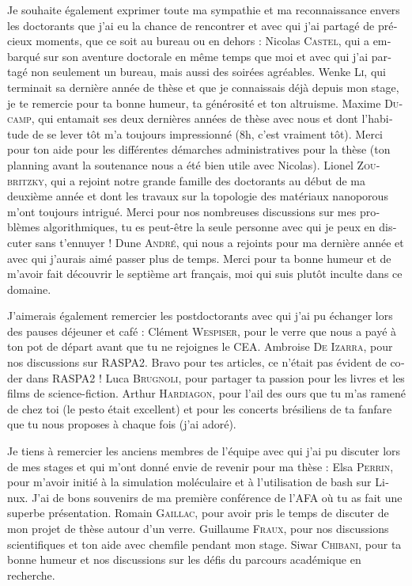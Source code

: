 \begin{otherlanguage}{french}
Je souhaite également exprimer toute ma sympathie et ma reconnaissance envers les doctorants que j'ai eu la chance de rencontrer et avec qui j'ai partagé de précieux moments, que ce soit au bureau ou en dehors :
Nicolas \textsc{Castel}, qui a embarqué sur son aventure doctorale en même temps que moi et avec qui j'ai partagé non seulement un bureau, mais aussi des soirées agréables.
Wenke \textsc{Li}, qui terminait sa dernière année de thèse et que je connaissais déjà depuis mon stage, je te remercie pour ta bonne humeur, ta générosité et ton altruisme.
Maxime \textsc{Ducamp}, qui entamait ses deux dernières années de thèse avec nous et dont l'habitude de se lever tôt m'a toujours impressionné (8h, c'est vraiment tôt). Merci pour ton aide pour les différentes démarches administratives pour la thèse (ton planning avant la soutenance nous a été bien utile avec Nicolas).
Lionel \textsc{Zoubritzky}, qui a rejoint notre grande famille des doctorants au début de ma deuxième année et dont les travaux sur la topologie des matériaux nanoporous m'ont toujours intrigué. Merci pour nos nombreuses discussions sur mes problèmes algorithmiques, tu es peut-être la seule personne avec qui je peux en discuter sans t'ennuyer !
Dune \textsc{André}, qui nous a rejoints pour ma dernière année et avec qui j'aurais aimé passer plus de temps. Merci pour ta bonne humeur et de m'avoir fait découvrir le septième art français, moi qui suis plutôt inculte dans ce domaine.

J'aimerais également remercier les postdoctorants avec qui j'ai pu échanger lors des pauses déjeuner et café :
Clément \textsc{Wespiser}, pour le verre que nous a payé à ton pot de départ avant que tu ne rejoignes le CEA.
Ambroise \textsc{De Izarra}, pour nos discussions sur RASPA2. Bravo pour tes articles, ce n'était pas évident de coder dans RASPA2 !
Luca \textsc{Brugnoli}, pour partager ta passion pour les livres et les films de science-fiction. 
Arthur \textsc{Hardiagon}, pour l'ail des ours que tu m'as ramené de chez toi (le pesto était excellent) et pour les concerts brésiliens de ta fanfare que tu nous proposes à chaque fois (j'ai adoré).

Je tiens à remercier les anciens membres de l'équipe avec qui j'ai pu discuter lors de mes stages et qui m'ont donné envie de revenir pour ma thèse :
Elsa \textsc{Perrin}, pour m'avoir initié à la simulation moléculaire et à l'utilisation de {\normalfont bash} sur {\normalfont Linux}. J'ai de bons souvenirs de ma première conférence de l'{\normalfont AFA} où tu as fait une superbe présentation.
Romain \textsc{Gaillac}, pour avoir pris le temps de discuter de mon projet de thèse autour d'un verre.
Guillaume \textsc{Fraux}, pour nos discussions scientifiques et ton aide avec {\normalfont chemfile} pendant mon stage.
Siwar \textsc{Chibani}, pour ta bonne humeur et nos discussions sur les défis du parcours académique en recherche.


\end{otherlanguage}
